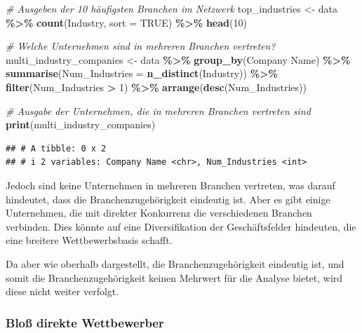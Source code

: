 \documentclass[
]{article}
\newenvironment{Shaded}{\begin{snugshade}}{\end{snugshade}}
\newcommand{\AttributeTok}[1]{\textcolor[rgb]{0.13,0.29,0.53}{#1}}
\newcommand{\CommentTok}[1]{\textcolor[rgb]{0.56,0.35,0.01}{\textit{#1}}}
\newcommand{\ConstantTok}[1]{\textcolor[rgb]{0.56,0.35,0.01}{#1}}
\newcommand{\DecValTok}[1]{\textcolor[rgb]{0.00,0.00,0.81}{#1}}
\newcommand{\FunctionTok}[1]{\textcolor[rgb]{0.13,0.29,0.53}{\textbf{#1}}}
\newcommand{\NormalTok}[1]{#1}
\newcommand{\OtherTok}[1]{\textcolor[rgb]{0.56,0.35,0.01}{#1}}
\newcommand{\SpecialCharTok}[1]{\textcolor[rgb]{0.81,0.36,0.00}{\textbf{#1}}}
\newcommand{\StringTok}[1]{\textcolor[rgb]{0.31,0.60,0.02}{#1}}
\begin{document}
\begin{Shaded}
\begin{Highlighting}[]
\CommentTok{\# Ausgeben der 10 häufigsten Branchen im Netzwerk}
\NormalTok{top\_industries }\OtherTok{\textless{}{-}}\NormalTok{ data }\SpecialCharTok{\%\textgreater{}\%}
  \FunctionTok{count}\NormalTok{(Industry, }\AttributeTok{sort =} \ConstantTok{TRUE}\NormalTok{) }\SpecialCharTok{\%\textgreater{}\%}
  \FunctionTok{head}\NormalTok{(}\DecValTok{10}\NormalTok{)}

\CommentTok{\# Welche Unternehmen sind in mehreren Branchen vertreten?}
\NormalTok{multi\_industry\_companies }\OtherTok{\textless{}{-}}\NormalTok{ data }\SpecialCharTok{\%\textgreater{}\%}
  \FunctionTok{group\_by}\NormalTok{(}\StringTok{\textasciigrave{}}\AttributeTok{Company Name}\StringTok{\textasciigrave{}}\NormalTok{) }\SpecialCharTok{\%\textgreater{}\%}
  \FunctionTok{summarise}\NormalTok{(}\AttributeTok{Num\_Industries =} \FunctionTok{n\_distinct}\NormalTok{(Industry)) }\SpecialCharTok{\%\textgreater{}\%}
  \FunctionTok{filter}\NormalTok{(Num\_Industries }\SpecialCharTok{\textgreater{}} \DecValTok{1}\NormalTok{) }\SpecialCharTok{\%\textgreater{}\%}
  \FunctionTok{arrange}\NormalTok{(}\FunctionTok{desc}\NormalTok{(Num\_Industries))}

\CommentTok{\# Ausgabe der Unternehmen, die in mehreren Branchen vertreten sind}
\FunctionTok{print}\NormalTok{(multi\_industry\_companies)}
\end{Highlighting}
\end{Shaded}

\begin{verbatim}
## # A tibble: 0 x 2
## # i 2 variables: Company Name <chr>, Num_Industries <int>
\end{verbatim}

Jedoch sind keine Unternehmen in mehreren Branchen vertreten, was darauf
hindeutet, dass die Branchenzugehörigkeit eindeutig ist. Aber es gibt
einige Unternehmen, die mit direkter Konkurrenz die verschiedenen
Branchen verbinden. Dies könnte auf eine Diversifikation der
Geschäftsfelder hindeuten, die eine breitere Wettbewerbsbasis schafft.

Da aber wie oberhalb dargestellt, die Branchenzugehörigkeit eindeutig
ist, und somit die Branchenzugehörigkeit keinen Mehrwert für die Analyse
bietet, wird diese nicht weiter verfolgt.

\subsubsection{Bloß direkte
Wettbewerber}\label{blouxdf-direkte-wettbewerber}
\end{document}
